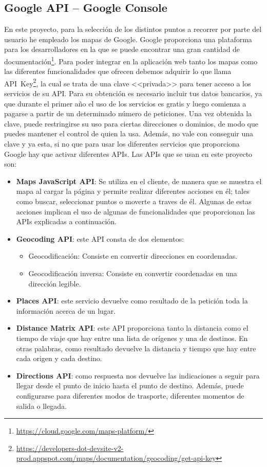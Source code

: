 \subsection{Google API -- Google Console}
En este proyecto, para la selección de los distintos puntos a recorrer por parte del usuario he empleado los mapas de Google. Google proporciona una plataforma para los desarrolladores en la que se puede encontrar una gran cantidad de documentación\footnote{\url{https://cloud.google.com/maps-platform/}}.
Para poder integrar en la aplicación web tanto los mapas como las diferentes funcionalidades que ofrecen debemos adquirir lo que llama API~Key\footnote{\url{https://developers-dot-devsite-v2-prod.appspot.com/maps/documentation/geocoding/get-api-key}}, la cual se trata de una clave <<privada>> para tener acceso a los servicios de su API. Para su obtención es necesario incluir tus datos bancarios, ya que durante el primer año el uso de los servicios es gratis y luego comienza a pagarse a partir de un determinado número de peticiones.
Una vez obtenida la clave, puede restringirse su uso para ciertas direcciones o dominios, de modo que puedes mantener el control de quien la usa. Además, no vale con conseguir una clave y ya esta, si no que para usar los diferentes servicios que proporciona Google hay que activar diferentes APIs.
Las APIs que se usan en este proyecto son:
\begin{itemize}
	\item \textbf{Maps JavaScript API}: Se utiliza en el cliente, de manera que se muestra el mapa al cargar la página y permite realizar diferentes acciones en él; tales como buscar, seleccionar puntos o moverte a traves de él. Algunas de estas acciones implican el uso de algunas de funcionalidades que proporcionan las APIs explicadas a continuación.
	\item \textbf{Geocoding API}: este API consta de dos elementos:
	\begin{itemize}
		\item Geocodificación: Consiste en convertir direcciones en coordenadas.
		\item Geocodificación inversa: Consiste en convertir coordenadas en una dirección legible.
	\end{itemize}
	\item \textbf{Places API}: este servicio devuelve como resultado de la petición toda la información acerca de un lugar.
	\item \textbf{Distance Matrix API}: este API proporciona tanto la distancia como el tiempo de viaje que hay entre una lista de orígenes y una de destinos. En otras palabras, como resultado devuelve la distancia y tiempo que hay entre cada origen y cada destino.
	\item \textbf{Directions API}: como respuesta nos devuelve las indicaciones a seguir para llegar desde el punto de inicio hasta el punto de destino. Además, puede configurarse para diferentes modos de trasporte, diferentes momentos de salida o llegada.
\end{itemize}

